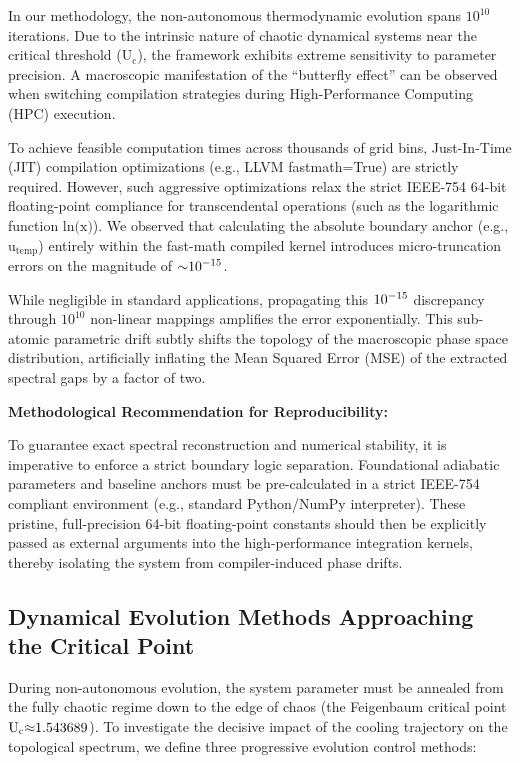 \documentclass[fractalfract,article,submit,oneauthor,pdftex]{Definitions/mdpi}
\begin{document}
In our methodology, the non-autonomous thermodynamic evolution spans
\(\text{10}^{\text{10}}\) iterations. Due to the intrinsic nature of
chaotic dynamical systems near the critical threshold
(\(\text{U}_{\text{c}}\)), the framework exhibits extreme sensitivity to
parameter precision. A macroscopic manifestation of the ``butterfly
effect'' can be observed when switching compilation strategies during
High-Performance Computing (HPC) execution.

To achieve feasible computation times across thousands of grid bins,
Just-In-Time (JIT) compilation optimizations (e.g., LLVM fastmath=True)
are strictly required. However, such aggressive optimizations relax the
strict IEEE-754 64-bit floating-point compliance for transcendental
operations (such as the logarithmic function
\(\text{ln(}\text{x}\text{)}\)). We observed that calculating the
absolute boundary anchor (e.g., \(\text{u}_{\text{temp}}\)) entirely
within the fast-math compiled kernel introduces micro-truncation errors
on the magnitude of \(\text{\ensuremath{\sim}}\text{10}^{\text{\ensuremath{-}15}}\).

While negligible in standard applications, propagating this
\(\text{10}^{\text{\ensuremath{-}15}}\) discrepancy through \(\text{10}^{\text{10}}\)
non-linear mappings amplifies the error exponentially. This sub-atomic
parametric drift subtly shifts the topology of the macroscopic phase
space distribution, artificially inflating the Mean Squared Error (MSE)
of the extracted spectral gaps by a factor of two.

\textbf{Methodological Recommendation for Reproducibility:}

To guarantee exact spectral reconstruction and numerical stability, it
is imperative to enforce a strict boundary logic separation.
Foundational adiabatic parameters and baseline anchors must be
pre-calculated in a strict IEEE-754 compliant environment (e.g.,
standard Python/NumPy interpreter). These pristine, full-precision
64-bit floating-point constants should then be explicitly passed as
external arguments into the high-performance integration kernels,
thereby isolating the system from compiler-induced phase drifts.

\subsection{Dynamical Evolution Methods Approaching the Critical Point}

During non-autonomous evolution, the system parameter must be annealed
from the fully chaotic regime down to the edge of chaos (the Feigenbaum
critical point \(\text{U}_{\text{c}}\text{\ensuremath{\approx}1.543689}\)). To investigate
the decisive impact of the cooling trajectory on the topological
spectrum, we define three progressive evolution control methods:
\end{document}
